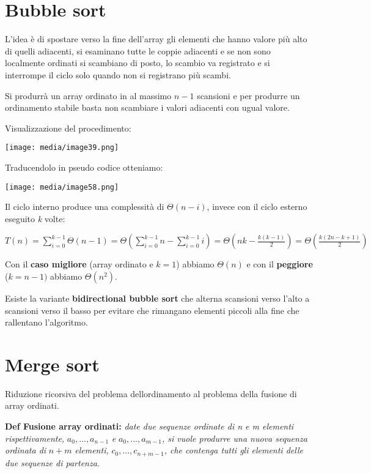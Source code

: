 \section{Bubble sort}\label{bubble-sort}

L'idea è di spostare verso la fine dell'array gli elementi che hanno
valore più alto di quelli adiacenti, si esaminano tutte le coppie
adiacenti e se non sono localmente ordinati si scambiano di posto, lo
scambio va registrato e si interrompe il ciclo solo quando non si
registrano più scambi.

Si produrrà un array ordinato in al massimo \(n - 1\) scansioni e per
produrre un ordinamento stabile basta non scambiare i valori adiacenti
con ugual valore.

Visualizzazione del procedimento:

\texttt{[image: media/image39.png]}

Traducendolo in pseudo codice otteniamo:

\texttt{[image: media/image58.png]}

Il ciclo interno produce una complessità di \(\Theta(n - i)\), invece
con il ciclo esterno eseguito \emph{k} volte:

\(T(n) = \sum_{i = 0}^{k - 1}\Theta(n - 1) = \Theta(\sum_{i = 0}^{k - 1}n - \sum_{i = 0}^{k - 1}i) = \Theta(nk - \frac{k(k - 1)}{2}) = \Theta(\frac{k(2n - k + 1)}{2})\)

Con il \textbf{caso migliore} (array ordinato e \(k = 1\)) abbiamo
\(\Theta(n)\) e con il \textbf{peggiore} (\(k = n - 1)\) abbiamo
\(\Theta(n^{2})\).

Esiste la variante \textbf{bidirectional bubble sort} che alterna
scansioni verso l'alto a scansioni verso il basso per evitare che
rimangano elementi piccoli alla fine che rallentano l'algoritmo.

\section{Merge sort}\label{merge-sort}

Riduzione ricorsiva del problema dell\textquotesingle ordinamento al
problema della fusione di array ordinati.

\textbf{Def \textbar{} Fusione array ordinati:} \emph{date due sequenze
ordinate di n e m elementi rispettivamente,} \(a_{0},...,a_{n - 1}\)
\emph{e} \(a_{0},...,a_{m - 1}\)\emph{, si vuole produrre una nuova
sequenza ordinata di} \(n + m\) \emph{elementi,}
\(c_{0},...,c_{n + m - 1}\)\emph{, che contenga tutti gli elementi delle
due sequenze di partenza.}

